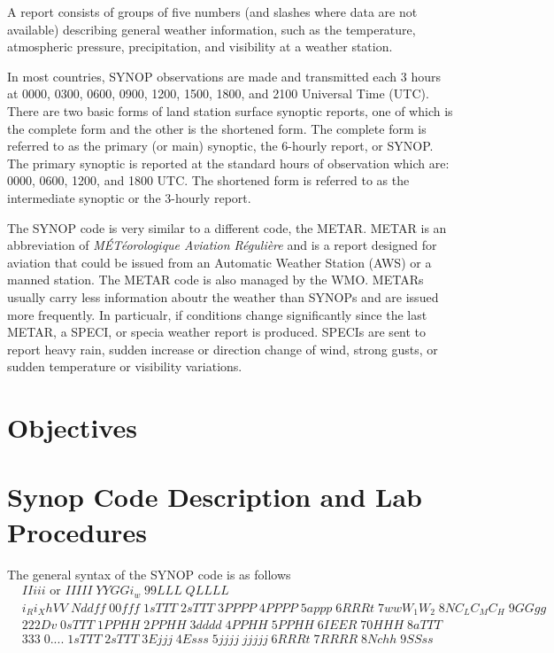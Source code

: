 \documentclass{article}
\begin{document}
A report consists  of groups of five numbers (and slashes
where data are not  available) describing general weather information,
such  as  the temperature,  atmospheric  pressure, precipitation,  and
visibility at a weather station.

In most countries, SYNOP observations are made and transmitted each 3
hours at 0000, 0300, 0600, 0900, 1200, 1500, 1800, and 2100 Universal
Time (UTC). There are two basic forms of land station surface synoptic
reports, one of which is the complete form and the other is the
shortened form. The complete form is referred to as the primary (or
main) synoptic, the 6-hourly report, or SYNOP. The primary synoptic is
reported at the standard hours of observation which are: 0000, 0600,
1200, and 1800 UTC. The shortened form is referred to as the
intermediate synoptic or the 3-hourly report.

The SYNOP code is very similar to a different code, the METAR. METAR
is an abbreviation of \textit{MÉTéorologique Aviation Régulière} and
is a report designed for aviation that could be issued from an
Automatic Weather Station (AWS) or a manned station. The METAR code is
also managed by the WMO. METARs usually carry less information aboutr
the weather than SYNOPs and are issued more frequently. In particualr,
if conditions change significantly since the last METAR, a SPECI, or
specia weather report is produced. SPECIs are sent to report heavy
rain, sudden increase or direction change of wind, strong gusts, or
sudden temperature or visibility variations.

\section{Objectives}



\section{Synop Code Description and Lab Procedures}

The general syntax of the SYNOP code is as follows
\begin{align*}
&IIiii \text{ or } IIIII\; YYGGi_w\; 99LLL\; QLLLL\\
&i_Ri_XhVV\; Nddff\; 00fff\; 1sTTT\; 2sTTT\; 3PPPP\; 4PPPP\; 5appp\; 6RRRt\; 7wwW_1W_2\; 8NC_LC_MC_H\; 9GGgg\\
&222Dv\; 0sTTT\; 1PPHH\; 2PPHH\; 3dddd\; 4PPHH\; 5PPHH\; 6IEER\; 70HHH\; 8aTTT\\
&333\; 0....\; 1sTTT\; 2sTTT\; 3Ejjj\; 4Esss\; 5jjjj\; jjjjj\; 6RRRt\; 7RRRR\; 8Nchh\; 9SSss
\end{align*}
\end{document}
